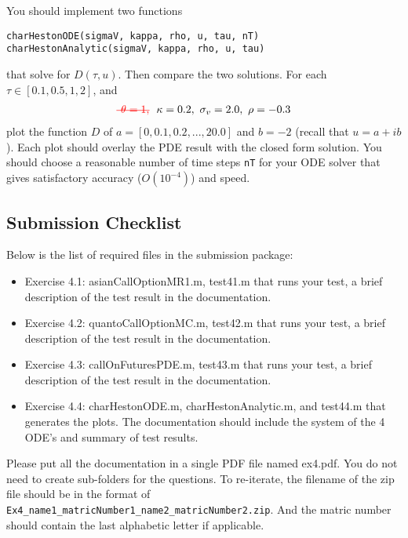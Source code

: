 \documentclass[10pt,a4paper,hidelinks,fleqn]{article}            %
\begin{document}
You should implement two functions
\begin{verbatim}
charHestonODE(sigmaV, kappa, rho, u, tau, nT)
charHestonAnalytic(sigmaV, kappa, rho, u, tau)
\end{verbatim}
that solve for $D(\tau, u)$. 
Then compare the two solutions. For each $\tau \in [0.1, 0.5, 1, 2]$, and
\begin{align*}
\textbf{\textcolor{red}{\st{$~\theta = 1, $}}} ~~\kappa = 0.2, ~\sigma_v = 2.0, ~\rho = -0.3
\end{align*}
plot the function $D$ of $a = [0, 0.1, 0.2, ..., 20.0]$ and $b = -2$ (recall that $u = a+ib$). 
Each plot should overlay the PDE result with the closed form solution.
You should choose a reasonable number of time steps \verb=nT= for your ODE solver that gives satisfactory accuracy ($O(10^{-4})$) and speed.


\subsection*{Submission Checklist}
Below is the list of required files in the submission package:
\begin{itemize}
\item Exercise 4.1: asianCallOptionMR1.m, test41.m that runs your test, a brief description of the test result in the documentation.
\item Exercise 4.2: quantoCallOptionMC.m, test42.m that runs your test, a brief description of the test result in the documentation.
\item Exercise 4.3: callOnFuturesPDE.m, test43.m that runs your test, a brief description of the test result in the documentation.
\item Exercise 4.4: charHestonODE.m, charHestonAnalytic.m, and test44.m that generates the plots. The documentation should include the system of the 4 ODE's and summary of test results.
\end{itemize}
Please put all the documentation in a single PDF file named ex4.pdf.
You do not need to create sub-folders for the questions. 
To re-iterate, the filename of the zip file should be in the format of \verb=Ex4_name1_matricNumber1_name2_matricNumber2.zip=.
And the matric number should contain the last alphabetic letter if applicable. 




\end{document}
